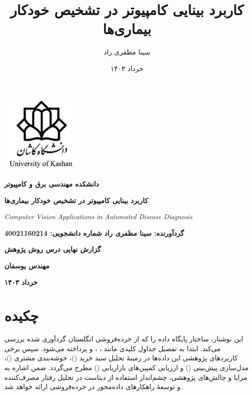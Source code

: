 \documentclass[12pt]{article}
\title{\textbf{کاربرد بینایی کامپیوتر در تشخیص خودکار بیماری‌ها}}
\author{سینا مظفری راد}
\date{خرداد ۱۴۰۳}
\renewcommand{\normalsize}{\fontsize{14}{16.8}\selectfont}
\begin{document}
\begin{titlepage}
    \centering
    \par
    \vspace{3cm}
    \includegraphics[width=0.3\textwidth]{kashanu.jpeg}\par
    \normalsize\textbf{دانشکده مهندسی برق و کامپیوتر}\par
    \vspace{1cm}
    {\secondfont\large\textbf{کاربرد بینایی کامپیوتر در تشخیص خودکار بیماری‌ها}\par}
    \vspace{0.5cm}
    {\latin\Large\textit{Computer Vision Applications in Automated Disease Diagnosis}\par}
    \Large\textbf{ گردآورنده: سینا مظفری راد \hspace{3cm} شماره دانشجویی: 40021160214 }\par
    \vspace{1cm}
    \large\textbf{گزارش نهایی درس روش پژوهش}\par
    \large\textbf{مهندس یوسفان}\par
    \large\textbf{خرداد ۱۴۰۳}\par
\end{titlepage}

\section*{\textbf{چکیده}}
این نوشتار، ساختار پایگاه داده  را که از خرده‌فروشی انگلستان گردآوری شده بررسی می‌کند. ابتدا به تفصیل جداول کلیدی مانند ، ،  و  پرداخته می‌شود. سپس برخی کاربردهای پژوهشی این داده‌ها در زمینهٔ تحلیل سبد خرید ()، خوشه‌بندی مشتری ()، مدل‌سازی پیش‌بینی () و ارزیابی کمپین‌های بازاریابی () مطرح می‌گردد. ضمن اشاره به مزایا و چالش‌های پژوهشی، چشم‌انداز استفاده از دیتاست  در تحلیل رفتار مصرف‌کننده و توسعهٔ راهکارهای داده‌محور در خرده‌فروشی ارائه خواهد شد.
\end{document}
